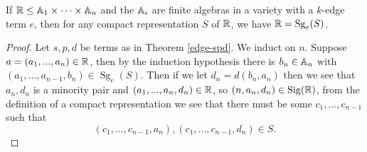 \documentclass[letterpaper,11pt]{article}
\DeclareMathOperator{\Sg}{Sg}
\DeclareMathOperator{\Sig}{Sig}
\begin{document}
\begin{thm}\label{edge-gen} If $\mathbb{R} \le \mathbb{A}_1 \times \cdots \times \mathbb{A}_n$ and the $\mathbb{A}_i$ are finite algebras in a variety with a $k$-edge term $e$, then for any compact representation $S$ of $\mathbb{R}$, we have $\RR = \Sg_{e}(S)$.
\end{thm}
\begin{proof} Let $s,p,d$ be terms as in Theorem \ref{edge-spd}. We induct on $n$. Suppose $a = (a_1, ..., a_n) \in \mathbb{R}$, then by the induction hypothesis there is $b_n \in \mathbb{A}_n$ with $(a_1, ..., a_{n-1}, b_n) \in \Sg_e(S)$. Then if we let $d_n = d(b_n,a_n)$ then we see that $a_n,d_n$ is a minority pair and $(a_1, ..., a_n, d_n) \in \mathbb{R}$, so $(n,a_n,d_n) \in \Sig(\RR)$, from the definition of a compact representation we see that there must be some $c_1, ..., c_{n-1}$ such that
\[
(c_1, ..., c_{n-1}, a_n), (c_1, ..., c_{n-1}, d_n) \in S.
\]


\end{proof}
\end{document}
